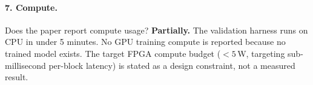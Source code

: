 \documentclass{article}
\begin{document}
\paragraph{7. Compute.}
Does the paper report compute usage?
\textbf{Partially.} The validation harness runs on CPU in under 5 minutes. No GPU training compute is reported because no trained model exists. The target FPGA compute budget ($<5$\,W, targeting sub-millisecond per-block latency) is stated as a design constraint, not a measured result.
\end{document}
